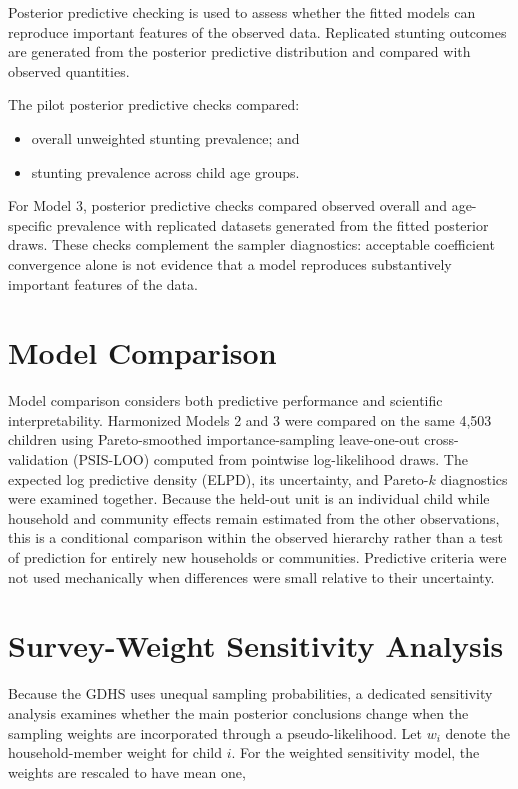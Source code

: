 Posterior predictive checking is used to assess whether the fitted models can reproduce important features of the observed data. Replicated stunting outcomes are generated from the posterior predictive distribution and compared with observed quantities.

The pilot posterior predictive checks compared:

\begin{itemize}
    \item overall unweighted stunting prevalence; and
    \item stunting prevalence across child age groups.
\end{itemize}

For Model 3, posterior predictive checks compared observed overall and age-specific prevalence with replicated datasets generated from the fitted posterior draws. These checks complement the sampler diagnostics: acceptable coefficient convergence alone is not evidence that a model reproduces substantively important features of the data.

\section{Model Comparison}

Model comparison considers both predictive performance and scientific interpretability. Harmonized Models 2 and 3 were compared on the same 4,503 children using Pareto-smoothed importance-sampling leave-one-out cross-validation (PSIS-LOO) computed from pointwise log-likelihood draws. The expected log predictive density (ELPD), its uncertainty, and Pareto-$k$ diagnostics were examined together. Because the held-out unit is an individual child while household and community effects remain estimated from the other observations, this is a conditional comparison within the observed hierarchy rather than a test of prediction for entirely new households or communities. Predictive criteria were not used mechanically when differences were small relative to their uncertainty.

\section{Survey-Weight Sensitivity Analysis}

Because the GDHS uses unequal sampling probabilities, a dedicated sensitivity analysis examines whether the main posterior conclusions change when the sampling weights are incorporated through a pseudo-likelihood. Let $w_i$ denote the household-member weight for child $i$. For the weighted sensitivity model, the weights are rescaled to have mean one,

